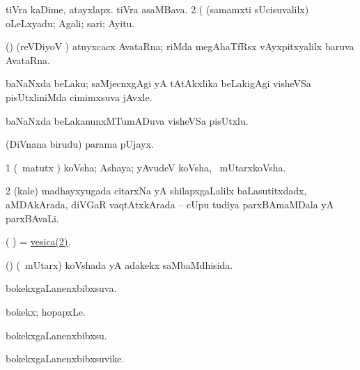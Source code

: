 \noindent 
\gl{\pagu}
\expl{}
\bmng
{} 
\bnum
{}  
\banum
{} tiVra kaDime, atayxlapx. 
 tiVra asaMBava. 
\eanum
\numie
\num{2}  (  (samamxti sUcisuvalilx) oLeLxyadu; Agali; sari; Ayitu. 
\enum
\emng
\eentry

\bentry
{}
\gl{\nA}
\expl{}
\bmng
 (\Bwvi) (reVDiyoV \vi) atuyxcacx AvataRna; riMda  megAhaTfRsx vAyxpitxyalilx baruva AvataRna. 
\emng
\eentry

\bentry
{} 
\gl{\nA}
\expl{}
\bmng
 baNaNxda beLaku; saMjecnxgAgi yA tAtAkxlika beLakigAgi visheVSa pisUtxliniMda cimimxsuva jAvxle. 
\emng
\eentry

\bentry
{} 
\gl{\nA}
\expl{}
\bmng
 baNaNxda beLakanunxMTumADuva visheVSa pisUtxlu. 
\emng
\eentry

\bentry
{}
\gl{\gu}
\expl{}
\bmng
 (DiVnana birudu) parama pUjayx. 
\emng
\eentry

\bentry
{} 
\gl{\nA}
\bmng
\bnum
\num{1} (\aMrashA\ matutx \pArxvi) koVsha; Ashaya; yAvudeV koVsha, \kanmu\ mUtarxkoVsha. 
\hypertarget{vesica(2)}{} 
\num{2} (kale) madhayxyugada citarxNa yA shilapxgaLalilx baLasutitxdadx, aMDAkArada, diVGaR vaqtAtxkArada -- cUpu tudiya parxBAmaMDala yA parxBAvaLi.  
\enum
\emng

\noindent 
\gl{\pagu}
\expl{}
\bmng
  ( ) = \hyperlink{vesica(2)}{vesica(2)}. 
\emng
\eentry

\bentry 
{}
\gl{\gu}
\bmng
(\aMrashA) (\kanmu\ mUtarx) koVshada yA adakekx saMbaMdhisida. 
\emng
\eentry

\bentry
{} 
\gl{\gu}
\expl{}
\bmng
bokekxgaLanenxbibxsuva. 
\emng
\eentry

\bentry
{} 
\gl{\nA}
\expl{}
\bmng
 bokekx; hopapxLe. 
\emng
\eentry

\bentry
{} 
\gl{\sakirx}
\expl{}
\bmng
 bokekxgaLanenxbibxsu. 
\emng
\eentry

\bentry
{} 
\gl{\nA}
\expl{}
\bmng
 bokekxgaLanenxbibxsuvike. 
\emng
\eentry

